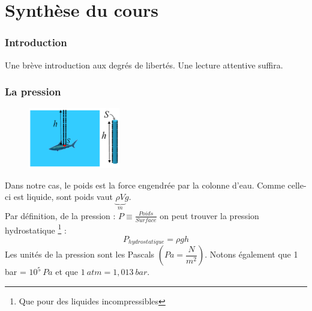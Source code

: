 \documentclass	[11pt, a4paper, openany]{book}
\begin{document}
\mainmatter
\part{Synthèse du cours}
\section{Introduction}
Une brève introduction aux degrés de libertés. Une lecture attentive suffira.

\section{La pression}

\begin{figure}
\includegraphics[width=4cm]{th/image1.png}
\end{figure}

Dans notre cas, le poids est la force engendrée par la colonne d'eau. Comme celle-ci est liquide, sont poids vaut $\underbrace{\rho V}_m  g$.\\
Par définition, de la pression : $P \equiv \frac{Poids}{Surface}$ on peut trouver la pression hydrostatique \footnote{Que pour des liquides incompressibles} :
\begin{equation}
P_{hydrostatique} = \rho g h
\end{equation}
Les unités de la pression sont les Pascals $\left(Pa = \dfrac{N}{m^2}\right)$. Notons également que 1 bar = $10^5\ Pa$ et que $1\ atm = 1,013\ bar$.
\end{document}
